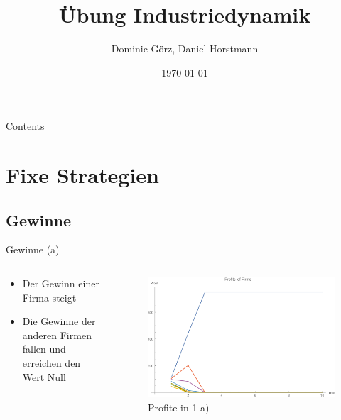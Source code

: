 \documentclass[xcolor={dvipsnames},10pt]{beamer}
\title[Industriedynamik]{Übung Industriedynamik}
\author{Dominic Görz, Daniel Horstmann}
\date{\today}
\begin{document}
\begin{frame}
  \maketitle
\end{frame}

\begin{frame}{Contents}
  \tableofcontents
\end{frame}

\section{Fixe Strategien}

\subsection{Gewinne}

\begin{frame}{Gewinne (a)}
\begin{columns}[T]
    \begin{column}{.3\textwidth}
      \begin{itemize}
      \item Der Gewinn einer Firma steigt
      \item Die Gewinne der anderen Firmen fallen und erreichen den Wert Null
      \end{itemize}
      \end{column}
      \begin{column}{.7\textwidth}
      \begin{figure}[t]
            \centering
            \includegraphics[scale=0.35]{../Plots/profit1a}
            \caption{Profite in 1 a)}
            \label{fig:profit1a}
       \end{figure}
    \end{column}
  \end{columns}
\end{frame}
\end{document}
